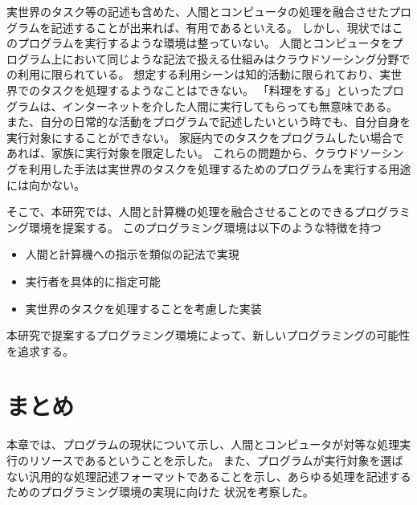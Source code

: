 実世界のタスク等の記述も含めた、人間とコンピュータの処理を融合させたプログラムを記述することが出来れば、有用であるといえる。
しかし、現状ではこのプログラムを実行するような環境は整っていない。
人間とコンピュータをプログラム上において同じような記法で扱える仕組みはクラウドソーシング分野での利用に限られている。
想定する利用シーンは知的活動に限られており、実世界でのタスクを処理するようなことはできない。
「料理をする」といったプログラムは、インターネットを介した人間に実行してもらっても無意味である。
また、自分の日常的な活動をプログラムで記述したいという時でも、自分自身を実行対象にすることができない。
家庭内でのタスクをプログラムしたい場合であれば、家族に実行対象を限定したい。
これらの問題から、クラウドソーシングを利用した手法は実世界のタスクを処理するためのプログラムを実行する用途には向かない。

そこで、本研究では、人間と計算機の処理を融合させることのできるプログラミング環境を提案する。
このプログラミング環境は以下のような特徴を持つ

\begin{itemize}
\itemsep1pt\parskip0pt
\item
  人間と計算機への指示を類似の記法で実現
\item
  実行者を具体的に指定可能
\item
  実世界のタスクを処理することを考慮した実装
\end{itemize}

本研究で提案するプログラミング環境によって、新しいプログラミングの可能性を追求する。

\section{まとめ}\label{ux307eux3068ux3081}

本章では、プログラムの現状について示し、人間とコンピュータが対等な処理実行のリソースであるということを示した。
また、プログラムが実行対象を選ばない汎用的な処理記述フォーマットであることを示し、あらゆる処理を記述するためのプログラミング環境の実現に向けた
状況を考察した。
